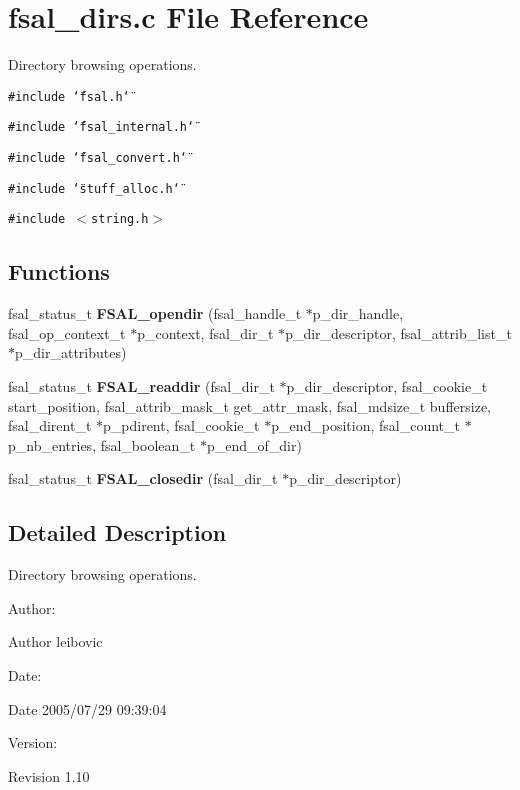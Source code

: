 \section{fsal\_\-dirs.c File Reference}
\label{fsal__dirs_8c}
Directory browsing operations. 

{\tt \#include \char`\"{}fsal.h\char`\"{}}\par
{\tt \#include \char`\"{}fsal\_\-internal.h\char`\"{}}\par
{\tt \#include \char`\"{}fsal\_\-convert.h\char`\"{}}\par
{\tt \#include \char`\"{}stuff\_\-alloc.h\char`\"{}}\par
{\tt \#include $<$string.h$>$}\par
\subsection*{Functions}
\begin{CompactItemize}
\item 
fsal\_\-status\_\-t {\bf FSAL\_\-opendir} (fsal\_\-handle\_\-t $\ast$p\_\-dir\_\-handle, fsal\_\-op\_\-context\_\-t $\ast$p\_\-context, fsal\_\-dir\_\-t $\ast$p\_\-dir\_\-descriptor, fsal\_\-attrib\_\-list\_\-t $\ast$p\_\-dir\_\-attributes)
\item 
fsal\_\-status\_\-t {\bf FSAL\_\-readdir} (fsal\_\-dir\_\-t $\ast$p\_\-dir\_\-descriptor, fsal\_\-cookie\_\-t start\_\-position, fsal\_\-attrib\_\-mask\_\-t get\_\-attr\_\-mask, fsal\_\-mdsize\_\-t buffersize, fsal\_\-dirent\_\-t $\ast$p\_\-pdirent, fsal\_\-cookie\_\-t $\ast$p\_\-end\_\-position, fsal\_\-count\_\-t $\ast$p\_\-nb\_\-entries, fsal\_\-boolean\_\-t $\ast$p\_\-end\_\-of\_\-dir)
\item 
fsal\_\-status\_\-t {\bf FSAL\_\-closedir} (fsal\_\-dir\_\-t $\ast$p\_\-dir\_\-descriptor)
\end{CompactItemize}


\subsection{Detailed Description}
Directory browsing operations. 

\begin{Desc}
\item[Author:]\begin{Desc}
\item[Author]leibovic \end{Desc}
\end{Desc}
\begin{Desc}
\item[Date:]\begin{Desc}
\item[Date]2005/07/29 09:39:04 \end{Desc}
\end{Desc}
\begin{Desc}
\item[Version:]\begin{Desc}
\item[Revision]1.10 \end{Desc}
\end{Desc}


